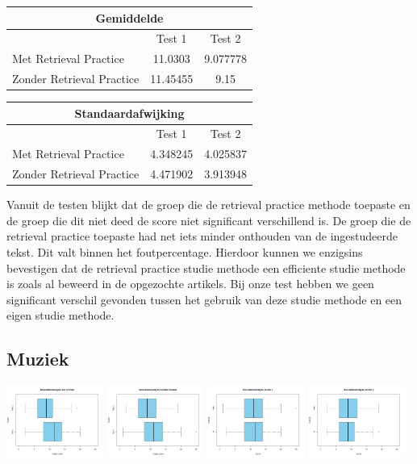 \documentclass{hogent-article}
\begin{document}
	\begin{tabular}{ |p{10em}|c|c| }
		\hline
			\multicolumn{3}{|c|}{Gemiddelde} \\
		\hline
			& Test 1 & Test 2 \\
		\hline
			Met Retrieval Practice & 11.0303 & 9.077778 \\
			Zonder Retrieval Practice & 11.45455 & 9.15 \\
		\hline
	\end{tabular}

	\begin{tabular}{ |p{10em}|c|c| }
	\hline
		\multicolumn{3}{|c|}{Standaardafwijking} \\
	\hline
		& Test 1 & Test 2 \\
	\hline
		Met Retrieval Practice & 4.348245 & 4.025837 \\
		Zonder Retrieval Practice & 4.471902 & 3.913948 \\
	\hline
	\end{tabular}
	
	Vanuit de testen blijkt dat de groep die de retrieval practice methode toepaste en de groep die dit niet deed de score niet significant verschillend is. De groep die de retrieval practice toepaste had net iets minder onthouden van de ingestudeerde tekst. Dit valt binnen het foutpercentage. Hierdoor kunnen we enzigsins bevestigen dat de retrieval practice studie methode een efficiente studie methode is zoals al beweerd in de opgezochte artikels. Bij onze test hebben we geen significant verschil gevonden tussen het gebruik van deze studie methode en een eigen studie methode.
	
	\subsection{Muziek}
	\includegraphics[width=120px]{Rplot_MetMuziek}	
	\includegraphics[width=120px]{Rplot_ZonderMuziek}
	\includegraphics[width=120px]{Rplot_Muziek_Score1}
	\includegraphics[width=120px]{Rplot_Muziek_Score2}
	
\end{document}
